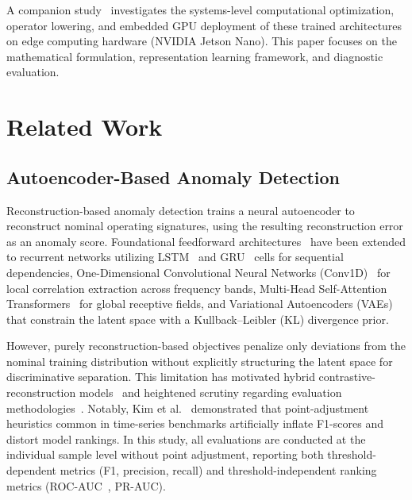 \documentclass[11pt,a4paper]{article}
\begin{document}
A companion study~\cite{jsc_edge_deployment} investigates the systems-level computational optimization, operator lowering, and embedded GPU deployment of these trained architectures on edge computing hardware (NVIDIA Jetson Nano). This paper focuses on the mathematical formulation, representation learning framework, and diagnostic evaluation.

\section{Related Work}
\label{sec:related}

\subsection{Autoencoder-Based Anomaly Detection}
Reconstruction-based anomaly detection trains a neural autoencoder to reconstruct nominal operating signatures, using the resulting reconstruction error as an anomaly score. Foundational feedforward architectures~\cite{rumelhart1986backprop} have been extended to recurrent networks utilizing LSTM~\cite{hochreiter1997lstm} and GRU~\cite{cho2014gru} cells for sequential dependencies, One-Dimensional Convolutional Neural Networks (Conv1D)~\cite{kiranyaz2019survey} for local correlation extraction across frequency bands, Multi-Head Self-Attention Transformers~\cite{vaswani2017attention} for global receptive fields, and Variational Autoencoders (VAEs)~\cite{kingma2013autoencoding} that constrain the latent space with a Kullback--Leibler (KL) divergence prior. 

However, purely reconstruction-based objectives penalize only deviations from the nominal training distribution without explicitly structuring the latent space for discriminative separation. This limitation has motivated hybrid contrastive-reconstruction models~\cite{gao2020robusttad,campos2021unsupervised,zimmerer2018contextvae} and heightened scrutiny regarding evaluation methodologies~\cite{yuan2022trustworthy}. Notably, Kim et al.~\cite{kim2021towards} demonstrated that point-adjustment heuristics common in time-series benchmarks artificially inflate F1-scores and distort model rankings. In this study, all evaluations are conducted at the individual sample level without point adjustment, reporting both threshold-dependent metrics (F1, precision, recall) and threshold-independent ranking metrics (ROC-AUC~\cite{fawcett2006roc}, PR-AUC).
\end{document}

